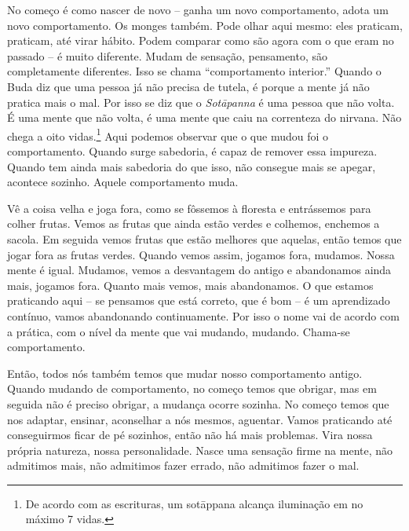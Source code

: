 No começo é como nascer de novo – ganha um novo comportamento, adota
um novo comportamento. Os monges também. Pode olhar aqui mesmo: eles
praticam, praticam, até virar hábito. Podem comparar como são agora com
o que eram no passado – é muito diferente. Mudam de sensação,
pensamento, são completamente diferentes. Isso se chama “comportamento
interior.” Quando o Buda diz que uma pessoa já não precisa de tutela, é
porque a mente já não pratica mais o mal. Por isso se diz que o
\textit{Sotāpanna} é uma pessoa que não volta. É uma mente que não
volta, é uma mente que caiu na correnteza do nirvana. Não chega a oito
vidas.\footnote{De acordo com as escrituras, um sotāppana alcança
iluminação em no máximo 7 vidas.} Aqui podemos observar que o que
mudou foi o comportamento. Quando surge sabedoria, é capaz de remover
essa impureza. Quando tem ainda mais sabedoria do que isso, não
consegue mais se apegar, acontece sozinho. Aquele comportamento muda. 

Vê a coisa velha e joga fora, como se fôssemos à floresta e
entrássemos para colher frutas. Vemos as frutas que ainda estão verdes
e colhemos, enchemos a sacola. Em seguida vemos frutas que estão
melhores que aquelas, então temos que jogar fora as frutas verdes.
Quando vemos assim, jogamos fora, mudamos. Nossa mente é igual.
Mudamos, vemos a desvantagem do antigo e abandonamos ainda mais,
jogamos fora. Quanto mais vemos, mais abandonamos. O que estamos
praticando aqui – se pensamos que está correto, que é bom – é um
aprendizado contínuo, vamos abandonando continuamente. Por isso o nome
vai de acordo com a prática, com o nível da mente que vai mudando,
mudando. Chama-se comportamento. 

Então, todos nós também temos que mudar nosso comportamento antigo.
Quando mudando de comportamento, no começo temos que obrigar, mas em
seguida não é preciso obrigar, a mudança ocorre sozinha. No começo
temos que nos adaptar, ensinar, aconselhar a nós mesmos, aguentar.
Vamos praticando até conseguirmos ficar de pé sozinhos, então não há
mais problemas. Vira nossa própria natureza, nossa personalidade. Nasce
uma sensação firme na mente, não admitimos mais, não admitimos fazer
errado, não admitimos fazer o mal. 

